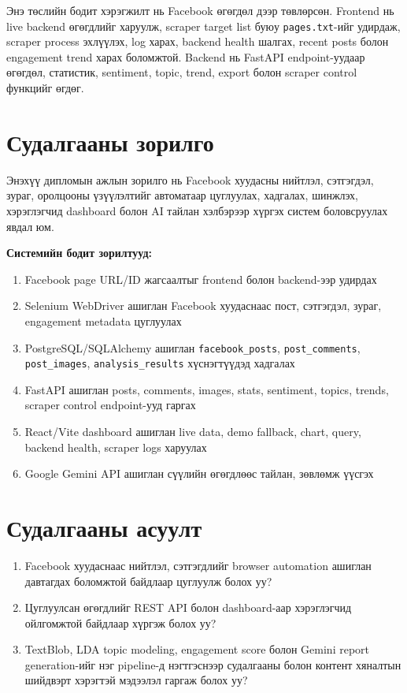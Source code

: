 \documentclass[
12pt,
oneside,
english,
onehalfspacing,
nolistspacing,
headsepline,
]{MUST-Thesis}
\begin{document}
Энэ төслийн бодит хэрэгжилт нь Facebook өгөгдөл дээр төвлөрсөн. Frontend нь live backend өгөгдлийг харуулж, scraper target list буюу \texttt{pages.txt}-ийг удирдаж, scraper process эхлүүлэх, log харах, backend health шалгах, recent posts болон engagement trend харах боломжтой. Backend нь FastAPI endpoint-уудаар өгөгдөл, статистик, sentiment, topic, trend, export болон scraper control функцийг өгдөг.

\section{Судалгааны зорилго}

Энэхүү дипломын ажлын зорилго нь Facebook хуудасны нийтлэл, сэтгэгдэл, зураг, оролцооны үзүүлэлтийг автоматаар цуглуулах, хадгалах, шинжлэх, хэрэглэгчид dashboard болон AI тайлан хэлбэрээр хүргэх систем боловсруулах явдал юм.

\textbf{Системийн бодит зорилтууд:}
\begin{enumerate}
    \item Facebook page URL/ID жагсаалтыг frontend болон backend-ээр удирдах
    \item Selenium WebDriver ашиглан Facebook хуудаснаас пост, сэтгэгдэл, зураг, engagement metadata цуглуулах
    \item PostgreSQL/SQLAlchemy ашиглан \texttt{facebook\_posts}, \texttt{post\_comments}, \texttt{post\_images}, \texttt{analysis\_results} хүснэгтүүдэд хадгалах
    \item FastAPI ашиглан posts, comments, images, stats, sentiment, topics, trends, scraper control endpoint-ууд гаргах
    \item React/Vite dashboard ашиглан live data, demo fallback, chart, query, backend health, scraper logs харуулах
    \item Google Gemini API ашиглан сүүлийн өгөгдлөөс тайлан, зөвлөмж үүсгэх
\end{enumerate}

\section{Судалгааны асуулт}

\begin{enumerate}
    \item Facebook хуудаснаас нийтлэл, сэтгэгдлийг browser automation ашиглан давтагдах боломжтой байдлаар цуглуулж болох уу?
    \item Цуглуулсан өгөгдлийг REST API болон dashboard-аар хэрэглэгчид ойлгомжтой байдлаар хүргэж болох уу?
    \item TextBlob, LDA topic modeling, engagement score болон Gemini report generation-ийг нэг pipeline-д нэгтгэснээр судалгааны болон контент хяналтын шийдвэрт хэрэгтэй мэдээлэл гаргаж болох уу?
\end{enumerate}
\end{document}

